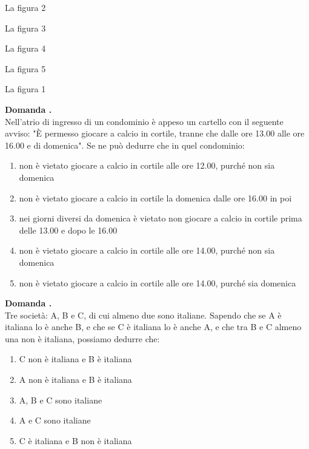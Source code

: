 \documentclass[20pt, a4paper]{article}
\newcounter{quesito}
\newcommand{\nuovoquesito}{\stepcounter{quesito}\textbf{Domanda \arabic{quesito}.}}
\newcommand{\itemdomanda}[2]{%
    \item \begin{minipage}[t]{\linewidth}
        \nuovoquesito \\ #1
        \begin{enumerate}[label=(\Alph*), nosep, leftmargin=*]
            #2
        \end{enumerate}
    \end{minipage}
    \vspace{10pt}
}
\begin{document}
\begin{enumerate}[leftmargin=*]
{\begin{center}
\end{center}
}{
    \item La figura 2
    \item La figura 3
    \item La figura 4
    \item La figura 5
    \item La figura 1
}

\itemdomanda{Nell'atrio di ingresso di un condominio è appeso un cartello con il seguente avviso: "È permesso giocare a calcio in cortile, tranne che dalle ore 13.00 alle ore 16.00 e di domenica". Se ne può dedurre che in quel condominio:}{
    \item non è vietato giocare a calcio in cortile alle ore 12.00, purché non sia domenica
    \item non è vietato giocare a calcio in cortile la domenica dalle ore 16.00 in poi
    \item nei giorni diversi da domenica è vietato non giocare a calcio in cortile prima delle 13.00 e dopo le 16.00
    \item non è vietato giocare a calcio in cortile alle ore 14.00, purché non sia domenica
    \item non è vietato giocare a calcio in cortile alle ore 14.00, purché sia domenica
}

\itemdomanda{Tre società: A, B e C, di cui almeno due sono italiane. Sapendo che se A è italiana lo è anche B, e che se C è italiana lo è anche A, e che tra B e C almeno una non è italiana, possiamo dedurre che:}{
    \item C non è italiana e B è italiana
    \item A non è italiana e B è italiana
    \item A, B e C sono italiane
    \item A e C sono italiane
    \item C è italiana e B non è italiana
}


\end{enumerate}
\end{document}
